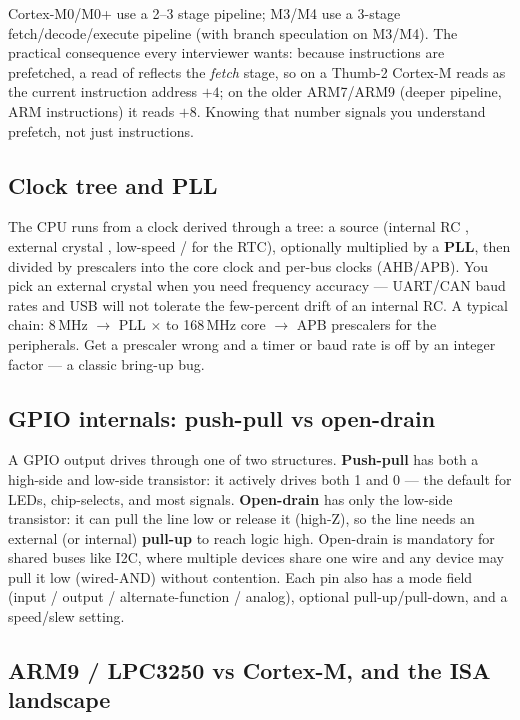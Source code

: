Cortex-M0/M0+ use a 2--3 stage pipeline; M3/M4 use a 3-stage
fetch/decode/execute pipeline (with branch speculation on M3/M4). The
practical consequence every interviewer wants: because instructions are
prefetched, a read of  reflects the \emph{fetch} stage, so on a
Thumb-2 Cortex-M  reads as the current instruction address $+4$; on
the older ARM7/ARM9 (deeper pipeline, ARM instructions) it reads $+8$. Knowing
that number signals you understand prefetch, not just instructions.

\subsection{Clock tree and PLL}

The CPU runs from a clock derived through a tree: a source (internal RC
, external crystal , low-speed / for
the RTC), optionally multiplied by a \textbf{PLL}, then divided by prescalers
into the core clock and per-bus clocks (AHB/APB). You pick an external crystal
when you need frequency accuracy --- UART/CAN baud rates and USB will not
tolerate the few-percent drift of an internal RC. A typical chain:
 8\,MHz $\rightarrow$ PLL $\times$ to 168\,MHz core $\rightarrow$
APB prescalers for the peripherals. Get a prescaler wrong and a timer or baud
rate is off by an integer factor --- a classic bring-up bug.

\subsection{GPIO internals: push-pull vs open-drain}

A GPIO output drives through one of two structures. \textbf{Push-pull} has
both a high-side and low-side transistor: it actively drives both 1 and 0 ---
the default for LEDs, chip-selects, and most signals. \textbf{Open-drain} has
only the low-side transistor: it can pull the line low or release it (high-Z),
so the line needs an external (or internal) \textbf{pull-up} to reach logic
high. Open-drain is mandatory for shared buses like I2C, where multiple
devices share one wire and any device may pull it low (wired-AND) without
contention. Each pin also has a mode field (input / output / alternate-function
/ analog), optional pull-up/pull-down, and a speed/slew setting.

\subsection{ARM9 / LPC3250 vs Cortex-M, and the ISA landscape}

